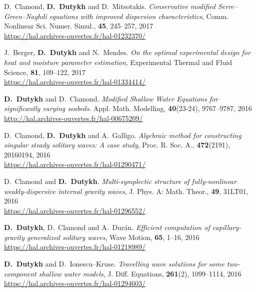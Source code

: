 \documentclass[final, a4paper, oneside, 12pt]{article}
\numberwithin{equation}{section}
\begin{document}
\begin{etaremune}
  \item D.~Clamond, \textbf{D.~Dutykh} and D.~Mitsotakis. \textit{Conservative modified Serre--Green--Naghdi equations with improved dispersion characteristics}, Comm. Nonlinear Sci. Numer. Simul., \textbf{45}, 245--257, 2017 \\ %
  \url{https://hal.archives-ouvertes.fr/hal-01232370/}

  \item J.~Berger, \textbf{D.~Dutykh} and N.~Mendes. \textit{On the optimal experimental design for heat and moisture parameter estimation}, Experimental Thermal and Fluid Science, \textbf{81}, 109--122, 2017 \\ %
  \url{https://hal.archives-ouvertes.fr/hal-01334414/}
  

  \item \textbf{D.~Dutykh} and D.~Clamond. \textit{Modified Shallow Water Equations for significantly varying seabeds}. Appl. Math. Modelling, \textbf{40}(23-24), 9767--9787, 2016 \\ %
  \url{http://hal.archives-ouvertes.fr/hal-00675209/}

  \item D.~Clamond, \textbf{D.~Dutykh} and A.~Galligo. \textit{Algebraic method for constructing singular steady solitary waves: A case study}, Proc. R. Soc. A., \textbf{472}(2191), 20160194, 2016 \\ %
  \url{https://hal.archives-ouvertes.fr/hal-01290471/}
  
  \item D.~Clamond and \textbf{D.~Dutykh}. \textit{Multi-symplectic structure of fully-nonlinear weakly-dispersive internal gravity waves}, J. Phys. A: Math. Theor., \textbf{49}, 31LT01, 2016 \\ %
  \url{https://hal.archives-ouvertes.fr/hal-01296552/}

  \item \textbf{D.~Dutykh}, D.~Clamond and A.~Dur\'an. \textit{Efficient computation of capillary-gravity generalized solitary waves}, Wave Motion, \textbf{65}, 1--16, 2016 \\ %
  \url{https://hal.archives-ouvertes.fr/hal-01218989/}
  
  \item \textbf{D.~Dutykh} and D.~Ionescu--Kruse. \textit{Travelling wave solutions for some two-component shallow water models}, J. Diff. Equations, \textbf{261}(2), 1099--1114, 2016 \\ %
  \url{https://hal.archives-ouvertes.fr/hal-01294603/}
  

\end{etaremune}
\end{document}
